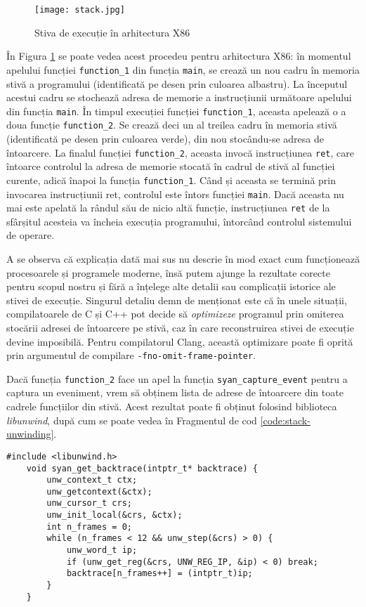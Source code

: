 \begin{figure}[ht]
\centering
\texttt{[image: stack.jpg]}
\caption{Stiva de execuție în arhitectura X86}
\label{fig:stack}
\end{figure}

În Figura \ref{fig:stack} se poate vedea acest procedeu pentru
arhitectura X86: în momentul apelului funcției \lstinline{function_1}
din funcția \lstinline{main}, se crează un nou cadru în memoria stivă a
programului (identificată pe desen prin culoarea albastru). La începutul
acestui cadru se stochează adresa de memorie a instrucțiunii următoare
apelului din funcția \lstinline{main}. În timpul execuției funcției
\lstinline{function_1}, aceasta apelează o a doua funcție
\lstinline{function_2}. Se crează deci un al treilea cadru în memoria
stivă (identificată pe desen prin culoarea verde), din nou stocându-se
adresa de întoarcere. La finalul funcției \lstinline{function_2},
aceasta invocă instrucțiunea \lstinline{ret}, care întoarce controlul la
adresa de memorie stocată în cadrul de stivă al funcției curente, adică
înapoi la funcția \lstinline{function_1}. Când și aceasta se termină
prin invocarea instrucțiunii ret, controlul este întors funcției
\lstinline{main}. Dacă aceasta nu mai este apelată la rândul său de
nicio altă funcție, instrucțiunea \lstinline{ret} de la sfârșitul
acesteia va încheia execuția programului, întorcând controlul sistemului
de operare.

A se observa că explicația dată mai sus nu descrie în mod exact cum
funcționează procesoarele și programele moderne, însă putem ajunge la
rezultate corecte pentru scopul nostru și fără a înțelege alte detalii
sau complicații istorice ale stivei de execuție. Singurul detaliu demn
de menționat este că în unele situații, compilatoarele de C și C++ pot
decide să \textit{optimizeze} programul prin omiterea stocării adresei
de întoarcere pe stivă, caz în care reconstruirea stivei de execuție
devine imposibilă. Pentru compilatorul Clang\cite{Clang}, această
optimizare poate fi oprită prin argumentul de compilare
\lstinline{-fno-omit-frame-pointer}.

Dacă funcția \lstinline{function_2} face un apel la funcția
\lstinline{syan_capture_event} pentru a captura un eveniment, vrem să
obținem lista de adrese de întoarcere din toate cadrele funcțiilor din
stivă. Acest rezultat poate fi obținut folosind biblioteca
\textit{libunwind}\cite{libunwind}, după cum se poate vedea în
Fragmentul de cod \ref{code:stack-unwinding}.

\begin{lstlisting}[caption=Capturarea stivei de execuție folosind
                           \lstinline{libunwind},
                   label=code:stack-unwinding,
                   float, floatplacement=H]
    #include <libunwind.h>
    void syan_get_backtrace(intptr_t* backtrace) {
        unw_context_t ctx;
        unw_getcontext(&ctx);
        unw_cursor_t crs;
        unw_init_local(&crs, &ctx);
        int n_frames = 0;
        while (n_frames < 12 && unw_step(&crs) > 0) {
            unw_word_t ip;
            if (unw_get_reg(&crs, UNW_REG_IP, &ip) < 0) break;
            backtrace[n_frames++] = (intptr_t)ip;
        }
    }
\end{lstlisting}

